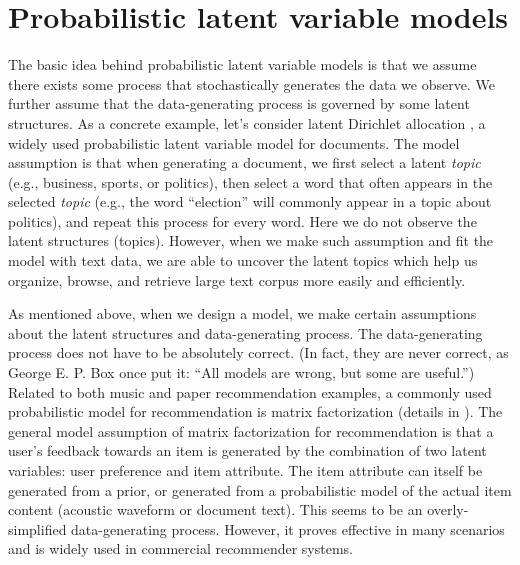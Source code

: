 \section{Probabilistic latent variable models}\label{chpt:intro:sec:model}

The basic idea behind probabilistic latent variable models is that we assume there exists some process that stochastically generates the data we observe. We further assume that the data-generating process is governed by some latent structures. As a concrete example, let's consider latent Dirichlet allocation \citep{blei2003latent}, a widely used probabilistic latent variable model for documents. The model assumption is that when generating a document, we first select a latent \textit{topic} (e.g., business, sports, or politics), then select a word that often appears in the selected \textit{topic} (e.g., the word ``election'' will commonly appear in a topic about politics), and repeat this process for every word. Here we do not observe the latent structures (topics). However, when we make such assumption and fit the model with text data, we are able to uncover the latent topics which help us organize, browse, and retrieve large text corpus more easily and efficiently. 

As mentioned above, when we design a model, we make certain assumptions about the latent structures and data-generating process. The data-generating process does not have to be absolutely correct. (In fact, they are never correct, as George E. P. Box once put it: ``All models are wrong, but some are useful.'') Related to both music and paper recommendation examples, a commonly used probabilistic model for recommendation is matrix factorization (details in ). The general model assumption of matrix factorization for recommendation is that a user's feedback towards an item is generated by the combination of two latent variables: user preference and item attribute. The item attribute can itself be generated from a prior, or generated from a probabilistic model of the actual item content (acoustic waveform or document text). This seems to be an overly-simplified data-generating process. However, it proves effective in many scenarios and is widely used in commercial recommender systems. 

